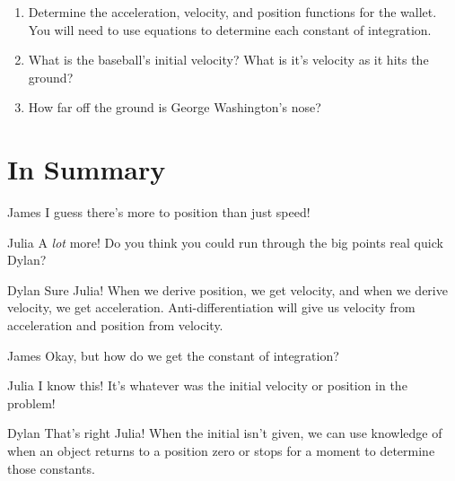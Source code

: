 \documentclass{ximera}
\begin{document}
\begin{enumerate}
\begin{enumerate}
\item{Determine the acceleration, velocity, and position functions for the wallet. You will need to use equations to determine each constant of integration.}
\item{What is the baseball's initial velocity? What is it's velocity as it hits the ground?}
\item{How far off the ground is George Washington's nose?}
\end{enumerate}
\end{enumerate}

\section{In Summary}
\begin{dialogue}
\item[James] I guess there's more to position than just speed!
\item[Julia] A \textit{lot} more! Do you think you could run through the big points real quick Dylan?
\item[Dylan] Sure Julia! When we derive position, we get velocity, and when we derive velocity, we get acceleration. Anti-differentiation will give us velocity from acceleration and position from velocity.
\item[James] Okay, but how do we get the constant of integration?
\item[Julia] I know this! It's whatever was the initial velocity or position in the problem!
\item[Dylan] That's right Julia! When the initial isn't given, we can use knowledge of when an object returns to a position zero or stops for a moment to determine those constants.
\end{dialogue}
\end{document}

